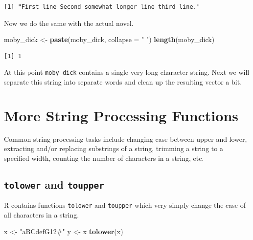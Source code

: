 \documentclass[
]{krantz}
\makeatletter
\newenvironment{Shaded}{\begin{snugshade}}{\end{snugshade}}
\newcommand{\DataTypeTok}[1]{\textcolor[rgb]{0.27,0.27,0.27}{#1}}
\newcommand{\KeywordTok}[1]{\textcolor[rgb]{0.27,0.27,0.27}{\textbf{#1}}}
\newcommand{\NormalTok}[1]{#1}
\newcommand{\StringTok}[1]{\textcolor[rgb]{0.5,0.5,0.5}{#1}}
\newenvironment{kframe}{%
\medskip{}
\setlength{\fboxsep}{.8em}
 \def\at@end@of@kframe{}%
 \ifinner\ifhmode%
  \def\at@end@of@kframe{\end{minipage}}%
  \begin{minipage}{\columnwidth}%
 \fi\fi%
 \def\FrameCommand##1{\hskip\@totalleftmargin \hskip-\fboxsep
 \colorbox{shadecolor}{##1}\hskip-\fboxsep
     \hskip-\linewidth \hskip-\@totalleftmargin \hskip\columnwidth}%
 \MakeFramed {\advance\hsize-\width
   \@totalleftmargin\z@ \linewidth\hsize
   \@setminipage}}%
 {\par\unskip\endMakeFramed%
 \at@end@of@kframe}
\renewenvironment{Shaded}{\begin{kframe}}{\end{kframe}}
\makeatother
\begin{document}
\begin{verbatim}
[1] "First line Second somewhat longer line third line."
\end{verbatim}

Now we do the same with the actual novel.

\begin{Shaded}
\begin{Highlighting}[]
\NormalTok{moby\_dick \textless{}{-}}\StringTok{ }\KeywordTok{paste}\NormalTok{(moby\_dick, }\DataTypeTok{collapse =} \StringTok{" "}\NormalTok{)}
\KeywordTok{length}\NormalTok{(moby\_dick)}
\end{Highlighting}
\end{Shaded}

\begin{verbatim}
[1] 1
\end{verbatim}

At this point \texttt{moby\_dick} contains a single very long character string. Next we will separate this string into separate words and clean up the resulting vector a bit.

\hypertarget{more-string-processing-functions}{%
\section{More String Processing Functions}\label{more-string-processing-functions}}

Common string processing tasks include changing case between upper and lower, extracting and/or replacing substrings of a string, trimming a string to a specified width, counting the number of characters in a string, etc.

\hypertarget{tolower-and-toupper}{%
\subsection{\texorpdfstring{\texttt{tolower} and \texttt{toupper}}{tolower and toupper}}\label{tolower-and-toupper}}

R contains functions \texttt{tolower} and \texttt{toupper} which very simply change the case of all characters in a string.

\begin{Shaded}
\begin{Highlighting}[]
\NormalTok{x \textless{}{-}}\StringTok{ "aBCdefG12\#"}
\NormalTok{y \textless{}{-}}\StringTok{ }\NormalTok{x}
\KeywordTok{tolower}\NormalTok{(x)}
\end{Highlighting}
\end{Shaded}
\end{document}
